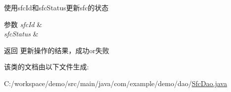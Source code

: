 使用sfc\+Id和sfc\+Status更新sfc的状态 
\begin{DoxyParams}{参数}
{\em sfc\+Id} & \\
\hline
{\em sfc\+Status} & \\
\hline
\end{DoxyParams}
\begin{DoxyReturn}{返回}
更新操作的结果，成功or失败 
\end{DoxyReturn}


该类的文档由以下文件生成\+:\begin{DoxyCompactItemize}
\item 
C\+:/workspace/demo/src/main/java/com/example/demo/dao/\mbox{\hyperlink{_sfc_dao_8java}{Sfc\+Dao.\+java}}\end{DoxyCompactItemize}
